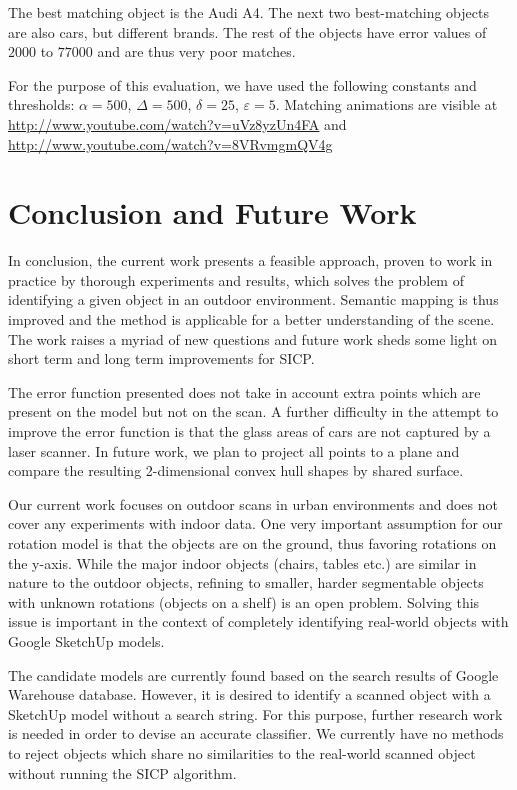 \documentclass{llncs}
\renewcommand{\epsilon}{\varepsilon}
\begin{document}
The best matching object is the Audi A4. The next two best-matching
objects are also cars, but different brands. The rest of the objects
have error values of $2000$ to $77000$ and are thus very poor matches.

For the purpose of this evaluation, we have used the following constants and thresholds: $\alpha=500$, $\Delta=500$, $\delta=25$, $\epsilon=5$. Matching animations are visible at 
\url{http://www.youtube.com/watch?v=uVz8yzUn4FA} and
\url{http://www.youtube.com/watch?v=8VRvmgmQV4g}

\section{Conclusion and Future Work}

In conclusion, the current work presents a feasible approach, proven
to work in practice by thorough experiments and results, which solves
the problem of identifying a given object in an outdoor
environment. Semantic mapping is thus improved and the method is
applicable for a better understanding of the scene. The work raises a
myriad of new questions and future work sheds some light on short term
and long term improvements for SICP.

The error function presented does not take in account extra points
which are present on the model but not on the scan. A further
difficulty in the attempt to improve the error function is that the
glass areas of cars are not captured by a laser scanner. In future
work, we plan to project all points to a plane and compare the
resulting 2-dimensional convex hull shapes by shared surface.

Our current work focuses on outdoor scans in urban environments and
does not cover any experiments with indoor data. One very important
assumption for our rotation model is that the objects are on the
ground, thus favoring rotations on the y-axis. While the major indoor
objects (chairs, tables etc.) are similar in nature to the outdoor
objects, refining to smaller, harder segmentable objects with unknown
rotations (objects on a shelf) is an open problem. Solving this issue
is important in the context of completely identifying real-world
objects with Google SketchUp models.

The candidate models are currently found based on the search results
of Google Warehouse database. However, it is desired to identify a
scanned object with a SketchUp model without a search string. For this
purpose, further research work is needed in order to devise an
accurate classifier. We currently have no methods to reject objects
which share no similarities to the real-world scanned object without
running the SICP algorithm.
\end{document}
